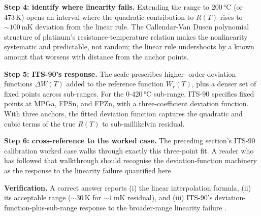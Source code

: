 \begin{exercise}
\textbf{Step 4: identify where linearity fails.} Extending the
range to $200 \,\si{\degreeCelsius}$ (or $473 \,\si{\kelvin}$)
opens an interval where the quadratic contribution to $R(T)$ rises
to $\sim 100 \,\si{\milli\kelvin}$ deviation from the linear rule.
The Callendar-Van Dusen polynomial structure of platinum's
resistance-temperature relation makes the nonlinearity systematic
and predictable, not random; the linear rule undershoots by a
known amount that worsens with distance from the anchor points.

\textbf{Step 5: ITS-90's response.} The scale prescribes higher-
order deviation functions $\Delta W(T)$ added to the reference
function $W_{r}(T)$, plus a denser set of fixed points across
sub-ranges. For the $0$-$420 \,\si{\degreeCelsius}$ sub-range,
ITS-90 specifies fixed points at MPGa, FPSn, and FPZn, with a
three-coefficient deviation function. With three anchors, the
fitted deviation function captures the quadratic and cubic terms
of the true $R(T)$ to sub-millikelvin residual.

\textbf{Step 6: cross-reference to the worked case.} The
preceding section's ITS-90 calibration worked case walks through
exactly this three-point fit. A reader who has followed that
walkthrough should recognise the deviation-function machinery as
the response to the linearity failure quantified here.

\textbf{Verification.} A correct answer reports (i) the linear
interpolation formula, (ii) its acceptable range ($\sim 30 \,\si{
\kelvin}$ for $\sim 1 \,\si{\milli\kelvin}$ residual), and (iii)
ITS-90's deviation-function-plus-sub-range response to the
broader-range linearity failure \cite{web:bipm-cct-its90}.
\end{exercise}

